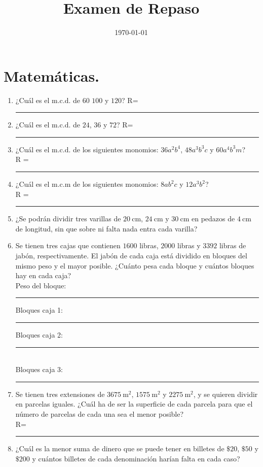 \documentclass[14pt]{exam}
\title{\vspace*{-2cm}Examen de Repaso\vspace{-5ex}}
\date{\today}
\begin{document}
\maketitle

\section{Matemáticas.}

\begin{enumerate}
\item ¿Cuál es el m.c.d. de $60$ $100$ y $120$? R= \rule{2cm}{0.1mm}
\item ¿Cuál es el m.c.d. de $24$, $36$ y $72$? R= \rule{2cm}{0.1mm}
\item ¿Cuál es el m.c.d. de los siguientes monomios: $36 a^{2} b^{4}$, $48 a^{3} b^{3} c$ y $60 a^{4} b^{3} m$? \\[0.5em]
R = \rule{3cm}{0.1mm}
\item ¿Cuál es el m.c.m de los siguientes monomios: $8 a b^{2} c$ y $12 a^{3} b^{2}$? \\[0.5em]
R = \rule{3cm}{0.1mm}
\item ¿Se podrán dividir tres varillas de $\SI{20}{\centi\meter}$, $\SI{24}{\centi\meter}$ y $\SI{30}{\centi\meter}$ en pedazos de $\SI{4}{\centi\meter}$ de longitud, sin que sobre ni falta nada entra cada varilla?
\item Se tienen tres cajas que contienen $1600$ libras, $2000$ libras y $3392$ libras de jabón, respectivamente. El jabón de cada caja está dividido en bloques del mismo peso y el mayor posible. ¿Cuánto pesa cada bloque y cuántos bloques hay en cada caja? \\[0.5em]
Peso del bloque: \rule{1.5cm}{0.1mm} \hspace{0.25cm} Bloques caja 1: \rule{1.5cm}{0.1mm} \hspace{0.25cm} Bloques caja 2: \rule{1.5cm}{0.1mm} \\[0.5em]
Bloques caja 3: \rule{1.5cm}{0.1mm}
\item Se tienen tres extensiones de $\SI{3675}{\square\meter}$, $\SI{1575}{\square\meter}$ y $\SI{2275}{\square\meter}$, y se quieren dividir en parcelas iguales. ¿Cuál ha de ser la superficie de cada parcela para que el número de parcelas de cada una sea el menor posible? \\[0.5em]
R= \rule{1.5cm}{0.1mm}
\item ¿Cuál es la menor suma de dinero que se puede tener en billetes de $\$20$, $\$50$ y $\$200$ y cuántos billetes de cada denominación harían falta en cada caso?

\end{enumerate}
\end{document}
